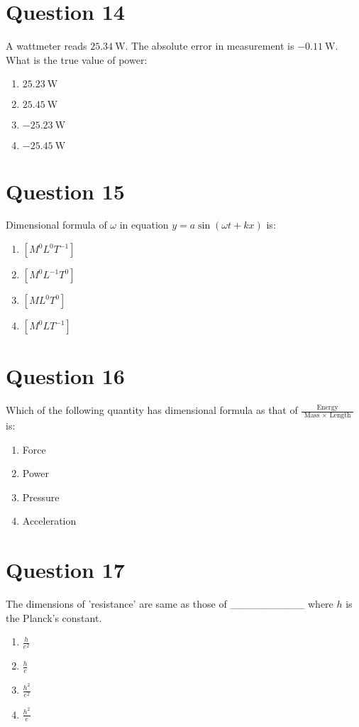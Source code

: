 \documentclass{article}
\begin{document}
\section*{Question 14}
A wattmeter reads \(25.34 \mathrm{~W}\). The absolute error in measurement is \(-0.11 \mathrm{~W}\). What is the true value of power:
\begin{enumerate}[label=(\alph*)]
\item \(25.23 \mathrm{~W}\)
\item \(25.45 \mathrm{~W}\)
\item \(-25.23 \mathrm{~W}\)
\item \(-25.45 \mathrm{~W}\)
\end{enumerate}
\newpage
\section*{Question 15}
Dimensional formula of \(\omega\) in equation \(y=a \sin (\omega t+k x)\) is:
\begin{enumerate}[label=(\alph*)]
\item \([M^0 L^0 T^{-1}]\)
\item \([M^0 L^{-1} T^0]\)
\item \([M L^0 T^0]\)
\item \([M^0 L T^{-1}]\)
\end{enumerate}
\newpage
\section*{Question 16}
Which of the following quantity has dimensional formula as that of \(\frac{\text { Energy }}{\text { Mass } \times \text { Length }}\) is:
\begin{enumerate}[label=(\alph*)]
\item Force
\item Power
\item Pressure
\item Acceleration
\end{enumerate}
\newpage
\section*{Question 17}
The dimensions of 'resistance' are same as those of __________ where \(h\) is the Planck's constant.
\begin{enumerate}[label=(\alph*)]
\item \(\frac{h}{e^2}\)
\item \(\frac{h}{e}\)
\item \(\frac{h^2}{e^2}\)\newline
\item \(\frac{h^2}{e}\)
\end{enumerate}
\newpage
\end{document}
